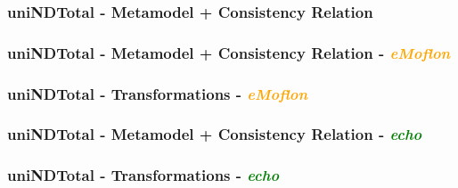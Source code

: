 \documentclass{beamer}
\begin{document}
\begin{frame}
\frametitle{\textbf{uniNDTotal} - \textbf{Metamodel + Consistency Relation}}

\end{frame}


\begin{frame}
\frametitle{uniNDTotal - \textbf{Metamodel + Consistency Relation} - \textbf{\textit{\textcolor{orange}{eMoflon}}}}

\end{frame}

\begin{frame}
\frametitle{uniNDTotal - \textbf{Transformations} - \textbf{\textit{\textcolor{orange}{eMoflon}}}}

\end{frame}


\begin{frame}
\frametitle{uniNDTotal - \textbf{Metamodel + Consistency Relation} - \textbf{\textit{\textcolor{green}{echo}}}}

\end{frame}

\begin{frame}
\frametitle{uniNDTotal - \textbf{Transformations} - \textbf{\textit{\textcolor{green}{echo}}}}

\end{frame}






\end{document}
